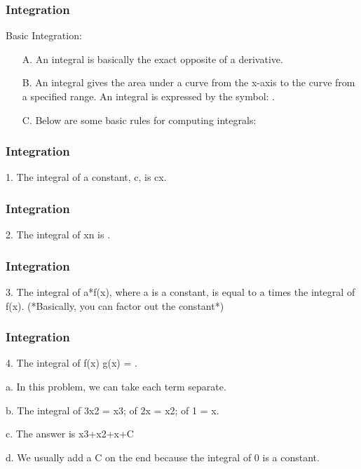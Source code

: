 \documentclass{beamer}
\begin{document}
\begin{frame}
	\frametitle{Integration}
	Basic Integration:
\begin{itemize}
\item[A.]  An integral is basically the exact opposite of a derivative.
	
\item[B.]  An integral gives the area under a curve from the x-axis to the curve from a specified range.  An integral is expressed by the symbol: .  
	
\item[C.]  Below are some basic rules for computing integrals:
\end{itemize}
	
\end{frame}
\begin{frame}
	\frametitle{Integration}
	
	1.  The integral of a constant, c, is cx.
	
\end{frame}
\begin{frame}
	\frametitle{Integration}
	
	
	2.  The integral of xn is .
	
\end{frame}
\begin{frame}
	\frametitle{Integration}
	3.  The integral of a*f(x), where a is a constant, is equal to a times the integral of f(x).  (*Basically, you can factor out the constant*)
	
	
\end{frame}
\begin{frame}
	\frametitle{Integration}
	4.  The integral of f(x)  g(x) = .  
	
	
	
	a.  In this problem, we can take each term separate.
	
	b.  The integral of 3x2 = x3; of 2x = x2; of 1 = x.
	
	c.  The answer is x3+x2+x+C
	
	d.  We usually add a C on the end because the integral of 0 is a constant.
\end{frame}
\end{document}
